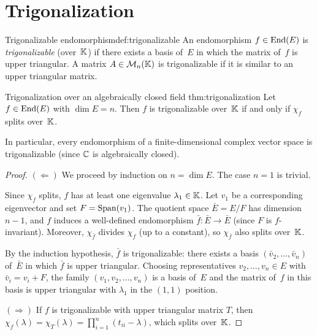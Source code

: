 \section{Trigonalization}\label{sec:trigonalization}

\begin{definition}{Trigonalizable endomorphism}{def:trigonalizable}
An endomorphism $f\in\operatorname{End}(E)$ is \emph{trigonalizable} (over~${\mathbb{K}}$)
if there exists a basis of~$E$ in which the matrix of~$f$ is upper
triangular.  A matrix $A\in\mathcal{M}_n({\mathbb{K}})$ is trigonalizable if it is
similar to an upper triangular matrix.
\end{definition}

\begin{theorem}{Trigonalization over an algebraically closed field}%
{thm:trigonalization}
Let $f\in\operatorname{End}(E)$ with $\dim E = n$.  Then $f$ is trigonalizable
over~${\mathbb{K}}$ if and only if $\chi_f$ splits over~${\mathbb{K}}$.

In particular, every endomorphism of a finite-dimensional complex
vector space is trigonalizable (since ${\mathbb{C}}$ is algebraically closed).
\end{theorem}

\begin{proof}
$(\Leftarrow)$\; We proceed by induction on $n = \dim E$.
The case $n = 1$ is trivial.

Since $\chi_f$ splits, $f$ has at least one eigenvalue
$\lambda_1\in{\mathbb{K}}$.  Let $v_1$ be a corresponding eigenvector and set
$F = \operatorname{Span}(v_1)$.  The quotient space $\bar{E} = E/F$ has
dimension~$n-1$, and $f$ induces a well-defined endomorphism
$\bar{f}\colon\bar{E}\to\bar{E}$ (since $F$ is $f$-invariant).
Moreover, $\chi_{\bar{f}}$ divides $\chi_f$ (up to a constant),
so $\chi_{\bar{f}}$ also splits over~${\mathbb{K}}$.

By the induction hypothesis, $\bar{f}$ is trigonalizable: there
exists a basis $(\bar{v}_2,\ldots,\bar{v}_n)$ of~$\bar{E}$ in which
$\bar{f}$ is upper triangular.  Choosing representatives
$v_2,\ldots,v_n\in E$ with $\bar{v}_i = v_i + F$, the family
$(v_1,v_2,\ldots,v_n)$ is a basis of~$E$ and the matrix of~$f$ in
this basis is upper triangular with $\lambda_1$ in the $(1,1)$
position.

$(\Rightarrow)$\; If $f$ is trigonalizable with upper triangular
matrix $T$, then $\chi_f(\lambda) = \chi_T(\lambda) = \prod_{i=1}^n
(t_{ii} - \lambda)$, which splits over~${\mathbb{K}}$.
\end{proof}

